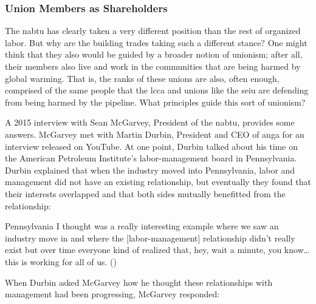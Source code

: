 \documentclass[12pt]{article}
\renewenvironment{quote}
  {\list{}{\leftmargin=\parindent\rightmargin=0pt}%
   \item\relax}
  {\endlist}
\begin{document}
\subsubsection{Union Members as Shareholders}

The \acrfull{nabtu} has clearly taken a very different position than the rest of organized labor. But why are the building trades taking such a different stance? One might think that they also would be guided by a broader notion of unionism; after all, their members also live and work in the communities that are being harmed by global warming. That is, the ranks of these unions are also, often enough, comprised of the same people that the \acrshort{lcca} and unions like the \acrshort{seiu} are defending from being harmed by the pipeline. What principles guide this sort of unionism?

A 2015 interview with Sean McGarvey, President of the \acrshort{nabtu}, provides some answers. McGarvey met with Martin Durbin, President and CEO of \acrfull{anga} for an interview released on YouTube. At one point, Durbin talked about his time on the American Petroleum Institute’s labor-management board in Pennsylvania. Durbin explained that when the industry moved into Pennsylvania, labor and management did not have an existing relationship, but eventually they found that their interests overlapped and that both sides mutually benefitted from the relationship:

\begin{quote}
Pennsylvania I thought was a really interesting example where we saw an industry move in and where the [labor-management] relationship didn't really exist but over time everyone kind of realized that, hey, wait a minute, you know\ldots{}this is working for all of us. (\cite{natgasnowNextInfrastructureChallenge2015})
\end{quote}

\noindent When Durbin asked McGarvey how he thought these relationships with management had been progressing, McGarvey responded:
\end{document}
